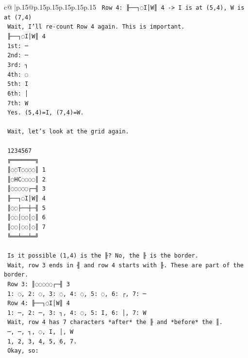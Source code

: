 \documentclass{article}
\begin{document}
{\begin{supertabular}{c@{$\;$}|p{.15\linewidth}@{}p{.15\linewidth}p{.15\linewidth}p{.15\linewidth}p{.15\linewidth}p{.15\linewidth}}
{{{\texttt{    Row 4: ╟──┐◌I│W║ 4 {-}> I is at (5,4), W is at (7,4)} \\
\texttt{    Wait, I'll re{-}count Row 4 again. This is important.} \\
\texttt{    ╟──┐◌I│W║ 4} \\
\texttt{    1st: ─} \\
\texttt{    2nd: ─} \\
\texttt{    3rd: ┐} \\
\texttt{    4th: ◌} \\
\texttt{    5th: I} \\
\texttt{    6th: │} \\
\texttt{    7th: W} \\
\texttt{    Yes. (5,4)=I, (7,4)=W.} \\
\\ 
\texttt{    Wait, let's look at the grid again.} \\
\\ 
\texttt{     1234567} \\
\texttt{    ╔═══════╗} \\
\texttt{    ║◌◌T◌◌◌◌║ 1} \\
\texttt{    ║◌HC◌◌◌◌║ 2} \\
\texttt{    ║◌◌◌◌◌┌─╢ 3} \\
\texttt{    ╟──┐◌I│W║ 4} \\
\texttt{    ║◌◌├──┼─╢ 5} \\
\texttt{    ║◌◌│◌◌│◌║ 6} \\
\texttt{    ║◌◌│◌◌│◌║ 7} \\
\texttt{    ╚══╧══╧═╝} \\
\\ 
\texttt{    Is it possible (1,4) is the ╟? No, the ╟ is the border.} \\
\texttt{    Wait, row 3 ends in ╢ and row 4 starts with ╟. These are part of the border.} \\
\texttt{    Row 3: ║◌◌◌◌◌┌─╢ 3} \\
\texttt{    1: ◌, 2: ◌, 3: ◌, 4: ◌, 5: ◌, 6: ┌, 7: ─} \\
\texttt{    Row 4: ╟──┐◌I│W║ 4} \\
\texttt{    1: ─, 2: ─, 3: ┐, 4: ◌, 5: I, 6: │, 7: W} \\
\texttt{    Wait, row 4 has 7 characters *after* the ╟ and *before* the ║.} \\
\texttt{    ─, ─, ┐, ◌, I, │, W} \\
\texttt{    1, 2, 3, 4, 5, 6, 7.} \\
\texttt{    Okay, so:} \\
}}}
\end{supertabular}}
\end{document}
